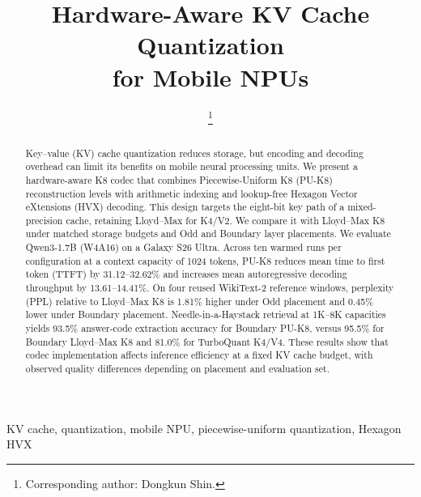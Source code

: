 \documentclass[conference,a4paper,10pt]{IEEEtran}
\begin{document}
\title{Hardware-Aware KV Cache Quantization\\for Mobile NPUs}
\author{
\and
{}
\thanks{Corresponding author: Dongkun Shin.}}
\maketitle

\begin{abstract}
Key--value (KV) cache quantization reduces storage, but encoding and decoding overhead can limit its benefits on mobile neural processing units. We present a hardware-aware K8 codec that combines Piecewise-Uniform K8 (PU-K8) reconstruction levels with arithmetic indexing and lookup-free Hexagon Vector eXtensions (HVX) decoding. This design targets the eight-bit key path of a mixed-precision cache, retaining Lloyd--Max for K4/V2. We compare it with Lloyd--Max K8 under matched storage budgets and Odd and Boundary layer placements. We evaluate Qwen3-1.7B (W4A16) on a Galaxy S26 Ultra. Across ten warmed runs per configuration at a context capacity of 1024 tokens, PU-K8 reduces mean time to first token (TTFT) by 31.12--32.62\% and increases mean autoregressive decoding throughput by 13.61--14.41\%. On four reused WikiText-2 reference windows, perplexity (PPL) relative to Lloyd--Max K8 is 1.81\% higher under Odd placement and 0.45\% lower under Boundary placement. Needle-in-a-Haystack retrieval at 1K--8K capacities yields 93.5\% answer-code extraction accuracy for Boundary PU-K8, versus 95.5\% for Boundary Lloyd--Max K8 and 81.0\% for TurboQuant K4/V4. These results show that codec implementation affects inference efficiency at a fixed KV cache budget, with observed quality differences depending on placement and evaluation set.
\end{abstract}

\begin{IEEEkeywords}
KV cache, quantization, mobile NPU, piecewise-uniform quantization, Hexagon HVX
\end{IEEEkeywords}
\end{document}
